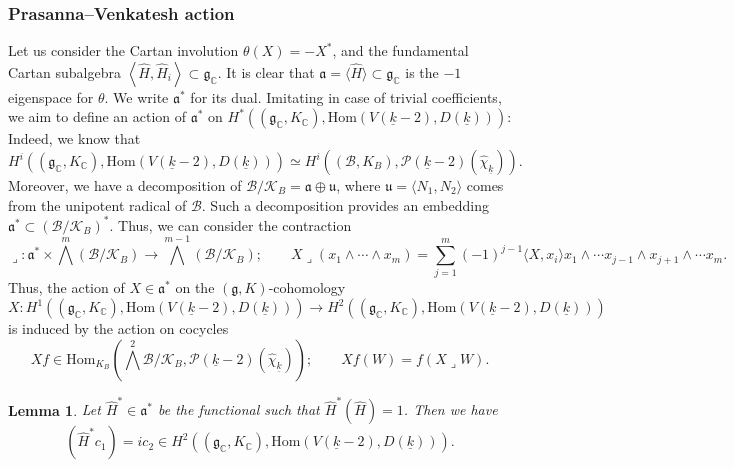 \documentclass{amsart}
\newtheorem{lemma}[theorem]{Lemma}
\theoremstyle{definition}
\theoremstyle{remark}
\numberwithin{equation}{section}
\newcommand{\C}{{\mathbb C}}
\newcommand{\cB}{{\mathcal B}}
\newcommand{\cK}{{\mathcal K}}
\newcommand{\cP}{{\mathcal P}}
\newcommand{\mfg}{{\mathfrak g}}
\newcommand{\Hom}{{\mathrm {Hom}}}
\begin{document}
\subsubsection{Prasanna--Venkatesh action}
Let us consider the Cartan involution $\theta(X)=-X^\ast$, and the fundamental Cartan subalgebra 
$\left\langle \hat H,\hat H_i\right\rangle\subset\mfg_\C$.
It is clear that $\mathfrak{a}=\langle\hat H\rangle\subset \mfg_\C$ is the $-1$ eigenspace for $\theta$. We write $\mathfrak{a}^\ast$ for its dual. Imitating \cite{PV} in case of trivial coefficients, we aim to define an action of $\mathfrak{a}^\ast$ on $H^\ast((\mfg_\C,K_\C),\Hom(V(\underline k-2),D({\underline k})))$: Indeed, we know that 
\[
H^i((\mfg_\C,K_\C),\Hom(V(\underline k-2),D({\underline k})))\simeq H^i((\cB,K_B),\cP(\underline k-2)(\hat\chi_{\underline k})).
\]
Moreover, we have a decomposition of $\cB/\cK_B=\mathfrak{a}\oplus \mathfrak{u}$, where $\mathfrak{u}=\langle N_1,N_2\rangle$ comes from the unipotent radical of $\cB$. Such a decomposition provides an embedding $\mathfrak{a}^\ast\subset (\cB/\cK_B)^\ast$. Thus, we can consider the contraction
\[
\lrcorner:\mathfrak{a}^\ast\times\bigwedge^m(\cB/\cK_B)\longrightarrow\bigwedge^{m-1}(\cB/\cK_B);\qquad X\lrcorner(x_1\wedge\cdots\wedge x_m)=\sum_{j=1}^m(-1)^{j-1}\langle X,x_i\rangle x_1\wedge\cdots x_{j-1}\wedge x_{j+1}\wedge\cdots x_m.
\]
Thus, the action of $X\in\mathfrak{a}^\ast$ on the $(\mfg,K)$-cohomology 
\[
X:H^1((\mfg_\C,K_\C),\Hom(V(\underline k-2),D({\underline k})))\longrightarrow H^2((\mfg_\C,K_\C),\Hom(V(\underline k-2),D({\underline k})))
\]
is induced by the action on cocycles
\[
Xf\in \Hom_{K_B}\left(\bigwedge^2\cB/\cK_B,\cP(\underline k-2)(\hat\chi_{\underline k})\right);\qquad Xf(W)=f(X\lrcorner W).
\]
\begin{lemma}\label{LemPraVen}
    Let $\hat H^\ast\in\mathfrak{a}^\ast$ be the functional such that $\hat H^\ast(\hat H)=1$. Then we have 
    \[
    (\hat H^\ast c_1)=ic_2\in H^2((\mfg_\C,K_\C),\Hom(V(\underline k-2),D({\underline k}))).
    \]
\end{lemma}
\end{document}
